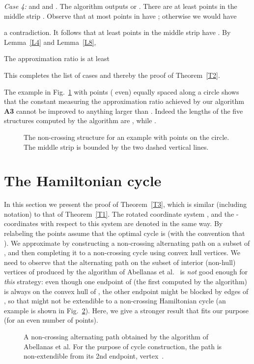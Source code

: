 \documentclass[proceedings]{stacs}
\begin{document}
\smallskip
{\em Case 4:}  and
 and .
The algorithm outputs  or .
There are at least  points in the middle strip .
Observe that at most  points in  have
; otherwise we would have

a contradiction. It follows that at least 
points in the middle strip have . By Lemma~\ref{L4}
and Lemma~\ref{L8},

The approximation ratio is at least

This completes the list of cases and thereby the proof of Theorem~\ref{T2}.


\smallskip
{}
The example in Fig.~\ref{f3} with  points ( even)
equally spaced along a circle shows that the constant 
measuring the approximation ratio achieved by our algorithm {\bf A3}
cannot be improved to anything larger than .
Indeed the lengths of the five structures computed by the algorithm
are ,
while .
\begin{figure} [htb]
\centerline{\epsfxsize=2.1in }
\caption{\small The non-crossing structure  for an example with
 points on the circle. The middle strip  is bounded by the
two dashed vertical lines.}
\label{f3}
\end{figure}





\section{The Hamiltonian cycle} \label{sec:cycle}

In this section we present the proof of Theorem~\ref{T3}, which is similar
(including notation) to that of Theorem~\ref{T1}.
The rotated coordinate system , and the -coordinates
 with respect to this system are denoted in the same way.
By relabeling the points assume that the optimal cycle is
 (with the convention that ).
We approximate  by constructing a non-crossing alternating path 
on a subset of , and then completing it to a non-crossing cycle using
convex hull vertices. We need to observe that the alternating path  on the
subset  of interior (non-hull) vertices of  produced by the algorithm of
Abellanas et al.~\cite{AGH+99} is {\em not} good enough for {\em this} strategy:
even though one endpoint of  (the first computed by the algorithm) is
always on the convex hull of , the other endpoint might be blocked by edges
of , so that  might not be extendible to a non-crossing Hamiltonian cycle
(an example is shown in Fig.~\ref{abell}). Here, we give a stronger result
that fits our purpose (for an even number of points).
\begin{figure} [htb]
\centerline{\epsfxsize=2in }
\caption{\small A non-crossing alternating path obtained by the algorithm of
  Abellanas et al. For the purpose of cycle construction, the path
is non-extendible from its 2nd endpoint, vertex~.}
\label{abell}
\end{figure}
\end{document}
